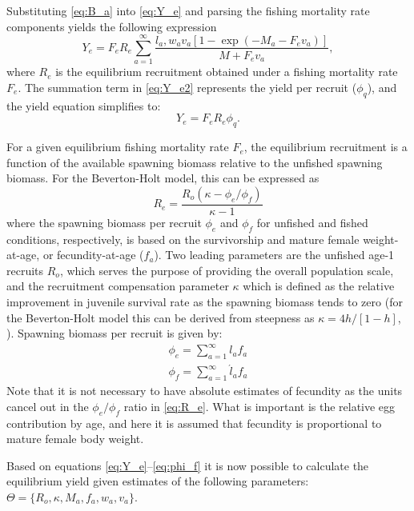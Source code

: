 Substituting \eqref{eq:B_a} into  \eqref{eq:Y_e} and parsing the fishing mortality rate components yields the following expression
\begin{equation}\label{eq:Y_e2}
	Y_e = F_e R_e \sum_{a=1}^\infty \frac{l_a,w_a v_a [1-\exp(-M_a-F_e v_a)]}{M+F_e v_a},
\end{equation}
where $R_e$ is the equilibrium recruitment obtained under a fishing mortality rate $F_e$. The summation term in \eqref{eq:Y_e2} represents the yield per recruit ($\phi_q$), and the yield equation simplifies to:
\begin{equation}\label{eq:Y_e3}
	Y_e = F_e R_e \phi_q.
\end{equation}

For a given equilibrium fishing mortality rate $F_e$, the equilibrium recruitment is a function of the available spawning biomass relative to the unfished spawning biomass. For the Beverton-Holt model, this can be expressed as
\begin{equation}\label{eq:R_e}
	R_e = \frac{R_o (\kappa-\phi_e/\phi_f)}{\kappa -1} 
\end{equation}
	where the spawning biomass per recruit $\phi_e$ and $\phi_f$ for unfished and fished conditions, respectively, is based on the survivorship and mature female weight-at-age,  or fecundity-at-age ($f_a$).  Two leading parameters are the unfished age-1 recruits $R_o$, which serves the purpose of providing the overall population scale, and the recruitment compensation parameter $\kappa$ which is defined as the relative improvement in juvenile survival rate as the spawning biomass tends to zero (for the Beverton-Holt model this can be derived from steepness as $\kappa= 4h/[1-h]$, \cite[see][for further details]{Martell2008pam}).  Spawning biomass per recruit is given by:
\begin{eqnarray}
	\phi_e = \sum_{a=1}^\infty l_a f_a\label{eq:phi_e}\\
	\phi_f = \sum_{a=1}^\infty \acute{l}_a f_a\label{eq:phi_f}
\end{eqnarray}
Note that it is not necessary to have absolute estimates of fecundity as the units cancel out in the $\phi_e/\phi_f$ ratio in \eqref{eq:R_e}. What is important is the relative egg contribution by age, and here it is assumed that fecundity is proportional to mature female body weight.

Based on equations \ref{eq:Y_e}--\ref{eq:phi_f} it is now possible to calculate the equilibrium yield given estimates of the following parameters: $\Theta = \{R_o, \kappa, M_a, f_a, w_a, v_a\}$.


